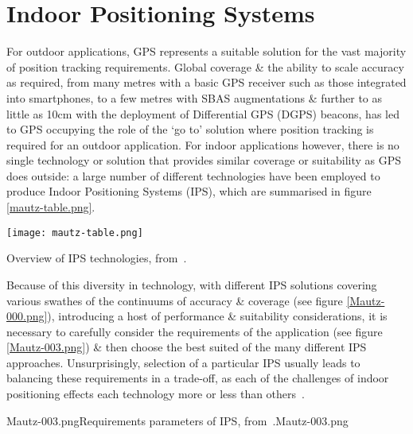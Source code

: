

\section{Indoor Positioning Systems}

For outdoor applications, GPS represents a suitable solution for the vast majority of position tracking requirements. Global coverage \& the ability to scale accuracy as required, from many metres with a basic GPS receiver such as those integrated into smartphones, to a few metres with SBAS augmentations \& further to as little as 10cm with the deployment of Differential GPS (DGPS) beacons, has led to GPS occupying the role of the `go to' solution where position tracking is required for an outdoor application. For indoor applications however, there is no single technology or solution that provides similar coverage or suitability as GPS does outside: a large number of different technologies have been employed to produce Indoor Positioning Systems (IPS), which are summarised in figure \ref{mautz-table.png}.

\begin{table}
	\begin{center}
		\texttt{[image: mautz-table.png]}
	\end{center}
	\caption{Overview of IPS technologies, from~\cite{Mautz2012}.}
	\label{mautz-table.png}
\end{table}

Because of this diversity in technology, with different IPS solutions covering various swathes of the continuums of accuracy \& coverage (see figure \ref{Mautz-000.png}), introducing a host of performance \& suitability considerations, it is necessary to carefully consider the requirements of the application (see figure \ref{Mautz-003.png}) \& then choose the best suited of the many different IPS approaches. Unsurprisingly, selection of a particular IPS usually leads to balancing these requirements in a trade-off, as each of the challenges of indoor positioning effects each technology more or less than others~\cite{Mautz2009}.

       {Mautz-003.png}{Requirements parameters of IPS, from~\cite{Mautz2012}.}{Mautz-003.png}

